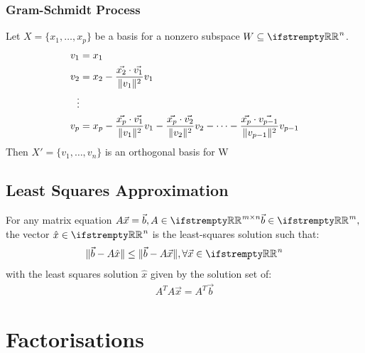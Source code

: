 \documentclass[12pt, a4paper]{article}
\begin{document}
\begin{multicols*}{3}
\subsubsection{Gram-Schmidt Process}
Let $X = \{x_1,\ldots,x_p\}$ be a basis for a nonzero subspace $W \subseteq \RR^n$.
\begin{align*}
  v_1 &= x_1 \\
  v_2 &= x_2 - \frac{\vec{x_2}\cdot\vec{v_1}}{\lVert v_1\rVert^2}v_1 \\
  \vdots \\
  v_p &= x_p - \frac{\vec{x_p}\cdot\vec{v_1}}{\lVert v_1\rVert^2}v_1 - \frac{\vec{x_p}\cdot\vec{v_2}}{\lVert v_2\rVert^2}v_2 - \cdots -  \frac{\vec{x_p}\cdot\vec{v_{p-1}}}{\lVert v_{p-1}\rVert^2}v_{p-1}    
\end{align*}
Then $X' = \{v_1,\ldots,v_n\}$ is an orthogonal basis for W

\subsection{Least Squares Approximation}
For any matrix equation $A\vec{x} = \vec{b}, A \in \RR^{m{\times}n} \vec{b} \in \RR^m,$ the vector $\hat{x} \in \RR^n$ is the least-squares solution such that:
\begin{align*}
  \norm{\vec{b} - A\hat{x}} \leq \norm{\vec{b} - A\vec{x}}, \forall \vec{x} \in \RR^n
\end{align*}
with the least squares solution $\hat{x}$ given by the solution set of:
\begin{align*}
  A^TA\vec{x} = A^T\vec{b}
\end{align*}

\colbreak

\section{Factorisations}


\end{multicols*}
\end{document}
